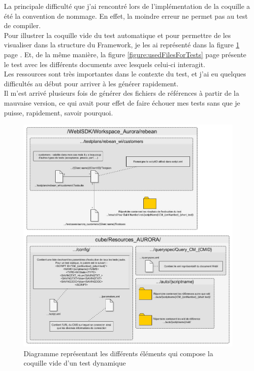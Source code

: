 La principale difficult\'{e} que j'ai rencontr\'{e} lors de l'impl\'{e}mentation de la coquille a \'{e}t\'{e} la convention de nommage. En effet, la moindre erreur ne permet pas au test de compiler.\\
Pour illustrer la coquille vide du test automatique et pour permettre de les visualiser dans la structure du \gls{Framework}, je les ai repr\'{e}sent\'{e} dans la figure \ref{figure:testEmptyShell} page \pageref{figure:testEmptyShell}. Et, de la m\^{e}me mani\`{e}re, la figure \ref{figure:usedFilesForTests} page \pageref{figure:usedFilesForTests} pr\'{e}sente le test avec les diff\'{e}rents documents avec lesquels celui-ci interagit.\\
Les ressources sont tr\`{e}s importantes dans le contexte du test, et j'ai eu quelques difficult\'{e}s au d\'{e}but pour arriver \`{a} les g\'{e}n\'{e}rer rapidement.\\
Il m'est arrivé plusieurs fois de g\'{e}n\'{e}rer des fichiers de r\'{e}f\'{e}rences \`{a} partir de la mauvaise version, ce qui avait pour effet de faire \'{e}chouer mes tests sans que je puisse, rapidement, savoir pourquoi.\\
\begin{figure}[H]
  \centering
      \includegraphics[width=\textwidth]{images/testEmptyShell.jpg}
  \caption{Diagramme repr\'{e}sentant les diff\'{e}rents \'{e}l\'{e}ments qui compose la coquille vide d'un test dynamique}
	\label{figure:testEmptyShell}
\end{figure}

